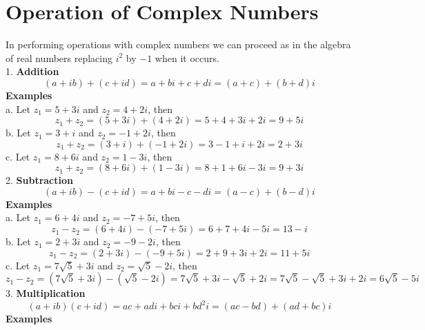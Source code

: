 \documentclass[a4paper, 12pt]{report}
\begin{document}
{\section{Operation of Complex Numbers}
In performing operations with complex numbers we can proceed as in the algebra of real numbers replacing $i^2$ by $-1$ when it occurs.\\
1. \textbf{Addition}
\begin{equation*}
(a + ib) + (c + id) = a + bi + c + di = (a + c) + (b + d)i
\end{equation*}
\textbf{Examples}\\
a. Let $z_1 = 5 + 3i$ and $z_2 = 4 + 2i$, then 
\begin{equation*}
z_1 + z_2 = (5 + 3i) + (4 + 2i) = 5 + 4 + 3i + 2i = 9 + 5i
\end{equation*}
b. Let $z_1 = 3 + i$ and $z_2 = -1 + 2i$, then
\begin{equation*}
z_1 + z_2 = (3 + i) + (-1 + 2i) = 3 - 1 + i + 2i = 2 + 3i
\end{equation*}
c. Let $z_1 = 8 + 6i$ and $z_2 = 1 - 3i$, then
\begin{equation*}
z_1 + z_2 = (8 + 6i) + (1 - 3i) = 8 + 1 + 6i - 3i = 9 + 3i
\end{equation*}
2. \textbf{Subtraction}
\begin{equation*}
(a + ib) - (c + id) = a + bi - c - di = (a - c) + (b - d)i
\end{equation*}
\textbf{Examples}\\
a. Let $z_1 = 6 + 4i$ and $z_2 = -7 + 5i$, then
\begin{equation*}
z_1 - z_2 = (6 + 4i) - (-7 + 5i) = 6 + 7 + 4i - 5i = 13 - i
\end{equation*}
b. Let $z_1 = 2 + 3i$ and $z_2 = - 9 - 2i$, then
\begin{equation*}
z_1 - z_2 = (2 + 3i) - (-9 + 5i) = 2 + 9 + 3i + 2i = 11 + 5i
\end{equation*}
c. Let $z_1 = 7\sqrt{5} + 3i$ and $z_2 = \sqrt{5} - 2i$, then
\begin{equation*}
z_1 - z_2 = (7\sqrt{5} + 3i) - (\sqrt{5} - 2i) = 7\sqrt{5} + 3i - \sqrt{5} + 2i = 7\sqrt{5} - \sqrt{5} + 3i + 2i = 6\sqrt{5} - 5i
\end{equation*}
3. \textbf{Multiplication}
\begin{equation*}
(a + ib)(c + id) = ac + adi + bci + bd^2i = (ac - bd) + (ad + bc)i
\end{equation*}
\textbf{Examples}\\

}
\end{document}
